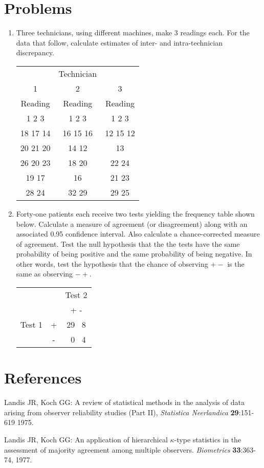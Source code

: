 \section{Problems}
\begin{enumerate}
\item Three technicians, using different machines, make 3 readings each. For the
data that follow, calculate estimates of inter- and intra-technician
discrepancy.
\begin{center}\begin{tabular}{ccc}
 & Technician & \\
 1 & 2 & 3 \\ \hline
 Reading & Reading & Reading \\ \hline
 1 2 3 & 1 2 3 & 1 2 3 \\ \hline
18 17 14 & 16 15 16 & 12 15 12 \\
20 21 20 & 14 12    & 13 \\
26 20 23 & 18 20    & 22 24\\
19 17    & 16       & 21 23\\
28 24    & 32 29    & 29 25\\ \hline
\end{tabular}\end{center}

\item Forty-one patients each receive two tests yielding the frequency table
shown below. Calculate a measure of agreement (or disagreement) along with an
associated 0.95 confidence interval. Also calculate a chance-corrected measure
of agreement. Test the null hypothesis that the the tests have the same
probability of being positive and the same probability of being negative. In
other words, test the hypothesis that the chance of observing $+-$ is the same
as observing $-+$.
\begin{center}\begin{tabular}{ccc}
 & & Test 2\\
 & &  + - \\
Test 1 & + & 29 ~8\\
       & - & ~0 ~4\\ \hline
\end{tabular}\end{center}
\end{enumerate}

\section{References}
Landis JR, Koch GG: A review of statistical methods in the analysis of
data arising from observer reliability studies (Part II), \emph{Statistica
Neerlandica} \textbf{29}:151-619 1975.

Landis JR, Koch GG: An application of hierarchical $\kappa$-type statistics
in the assessment of majority agreement among multiple observers.
\emph{Biometrics} \textbf{33}:363-74, 1977.
